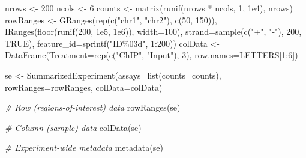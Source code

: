 \documentclass[
]{book}
\newenvironment{Shaded}{\begin{snugshade}}{\end{snugshade}}
\newcommand{\AttributeTok}[1]{\textcolor[rgb]{0.77,0.63,0.00}{#1}}
\newcommand{\CommentTok}[1]{\textcolor[rgb]{0.56,0.35,0.01}{\textit{#1}}}
\newcommand{\ConstantTok}[1]{\textcolor[rgb]{0.00,0.00,0.00}{#1}}
\newcommand{\DecValTok}[1]{\textcolor[rgb]{0.00,0.00,0.81}{#1}}
\newcommand{\FloatTok}[1]{\textcolor[rgb]{0.00,0.00,0.81}{#1}}
\newcommand{\FunctionTok}[1]{\textcolor[rgb]{0.00,0.00,0.00}{#1}}
\newcommand{\NormalTok}[1]{#1}
\newcommand{\OtherTok}[1]{\textcolor[rgb]{0.56,0.35,0.01}{#1}}
\newcommand{\SpecialCharTok}[1]{\textcolor[rgb]{0.00,0.00,0.00}{#1}}
\newcommand{\StringTok}[1]{\textcolor[rgb]{0.31,0.60,0.02}{#1}}
\begin{document}
\begin{Shaded}
\begin{Highlighting}[]
\NormalTok{nrows }\OtherTok{\textless{}{-}} \DecValTok{200}
\NormalTok{ncols }\OtherTok{\textless{}{-}} \DecValTok{6}
\NormalTok{counts }\OtherTok{\textless{}{-}} \FunctionTok{matrix}\NormalTok{(}\FunctionTok{runif}\NormalTok{(nrows }\SpecialCharTok{*}\NormalTok{ ncols, }\DecValTok{1}\NormalTok{, }\FloatTok{1e4}\NormalTok{), nrows)}
\NormalTok{rowRanges }\OtherTok{\textless{}{-}} \FunctionTok{GRanges}\NormalTok{(}\FunctionTok{rep}\NormalTok{(}\FunctionTok{c}\NormalTok{(}\StringTok{"chr1"}\NormalTok{, }\StringTok{"chr2"}\NormalTok{), }\FunctionTok{c}\NormalTok{(}\DecValTok{50}\NormalTok{, }\DecValTok{150}\NormalTok{)),}
                     \FunctionTok{IRanges}\NormalTok{(}\FunctionTok{floor}\NormalTok{(}\FunctionTok{runif}\NormalTok{(}\DecValTok{200}\NormalTok{, }\FloatTok{1e5}\NormalTok{, }\FloatTok{1e6}\NormalTok{)), }\AttributeTok{width=}\DecValTok{100}\NormalTok{),}
                     \AttributeTok{strand=}\FunctionTok{sample}\NormalTok{(}\FunctionTok{c}\NormalTok{(}\StringTok{"+"}\NormalTok{, }\StringTok{"{-}"}\NormalTok{), }\DecValTok{200}\NormalTok{, }\ConstantTok{TRUE}\NormalTok{),}
                     \AttributeTok{feature\_id=}\FunctionTok{sprintf}\NormalTok{(}\StringTok{"ID\%03d"}\NormalTok{, }\DecValTok{1}\SpecialCharTok{:}\DecValTok{200}\NormalTok{))}
\NormalTok{colData }\OtherTok{\textless{}{-}} \FunctionTok{DataFrame}\NormalTok{(}\AttributeTok{Treatment=}\FunctionTok{rep}\NormalTok{(}\FunctionTok{c}\NormalTok{(}\StringTok{"ChIP"}\NormalTok{, }\StringTok{"Input"}\NormalTok{), }\DecValTok{3}\NormalTok{),}
                     \AttributeTok{row.names=}\NormalTok{LETTERS[}\DecValTok{1}\SpecialCharTok{:}\DecValTok{6}\NormalTok{])}

\NormalTok{se }\OtherTok{\textless{}{-}} \FunctionTok{SummarizedExperiment}\NormalTok{(}\AttributeTok{assays=}\FunctionTok{list}\NormalTok{(}\AttributeTok{counts=}\NormalTok{counts),}
                     \AttributeTok{rowRanges=}\NormalTok{rowRanges, }\AttributeTok{colData=}\NormalTok{colData)}

\CommentTok{\# Row (regions{-}of{-}interest) data}
\FunctionTok{rowRanges}\NormalTok{(se)}

\CommentTok{\# Column (sample) data}
\FunctionTok{colData}\NormalTok{(se)}

\CommentTok{\# Experiment{-}wide metadata}
\FunctionTok{metadata}\NormalTok{(se)}
\end{Highlighting}
\end{Shaded}
\end{document}
